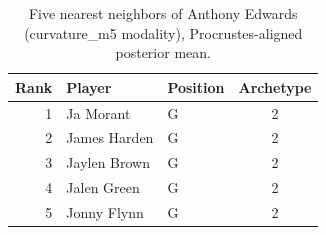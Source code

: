 \begin{table}[htbp]
  \centering\small
  \begin{tabular}{rllc}
    \toprule
    Rank & Player & Position & Archetype \\
    \midrule
    1 & Ja Morant & G & 2 \\
    2 & James Harden & G & 2 \\
    3 & Jaylen Brown & G & 2 \\
    4 & Jalen Green & G & 2 \\
    5 & Jonny Flynn & G & 2 \\
    \bottomrule
  \end{tabular}
  \caption{Five nearest neighbors of Anthony Edwards (curvature_m5 modality), Procrustes-aligned posterior mean.}
  \label{tab:Anthony_Edwards_neighbors_curvature_m5}
\end{table}

